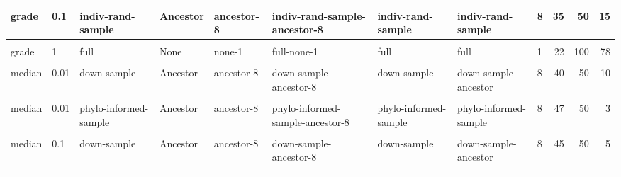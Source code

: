 \documentclass[
]{book}
\begin{document}
\begin{table}
\begin{tabular}{l|l|l|l|l|l|l|l|l|r|r|r}
\hline
grade & 0.1 & indiv-rand-sample & Ancestor & ancestor-8 & indiv-rand-sample-ancestor-8 & indiv-rand-sample & indiv-rand-sample & 8 & 35 & 50 & 15\\
\hline
\cellcolor{gray!6}{grade} & \cellcolor{gray!6}{0.1} & \cellcolor{gray!6}{phylo-informed-sample} & \cellcolor{gray!6}{Ancestor} & \cellcolor{gray!6}{ancestor-8} & \cellcolor{gray!6}{phylo-informed-sample-ancestor-8} & \cellcolor{gray!6}{phylo-informed-sample} & \cellcolor{gray!6}{phylo-informed-sample} & \cellcolor{gray!6}{8} & \cellcolor{gray!6}{29} & \cellcolor{gray!6}{50} & \cellcolor{gray!6}{21}\\
\hline
grade & 1 & full & None & none-1 & full-none-1 & full & full & 1 & 22 & 100 & 78\\
\hline
\cellcolor{gray!6}{median} & \cellcolor{gray!6}{0.01} & \cellcolor{gray!6}{down-sample} & \cellcolor{gray!6}{None} & \cellcolor{gray!6}{none-1} & \cellcolor{gray!6}{down-sample-none-1} & \cellcolor{gray!6}{down-sample} & \cellcolor{gray!6}{down-sample} & \cellcolor{gray!6}{1} & \cellcolor{gray!6}{50} & \cellcolor{gray!6}{50} & \cellcolor{gray!6}{0}\\
\hline
median & 0.01 & down-sample & Ancestor & ancestor-8 & down-sample-ancestor-8 & down-sample & down-sample-ancestor & 8 & 40 & 50 & 10\\
\hline
\cellcolor{gray!6}{median} & \cellcolor{gray!6}{0.01} & \cellcolor{gray!6}{indiv-rand-sample} & \cellcolor{gray!6}{Ancestor} & \cellcolor{gray!6}{ancestor-8} & \cellcolor{gray!6}{indiv-rand-sample-ancestor-8} & \cellcolor{gray!6}{indiv-rand-sample} & \cellcolor{gray!6}{indiv-rand-sample} & \cellcolor{gray!6}{8} & \cellcolor{gray!6}{45} & \cellcolor{gray!6}{50} & \cellcolor{gray!6}{5}\\
\hline
median & 0.01 & phylo-informed-sample & Ancestor & ancestor-8 & phylo-informed-sample-ancestor-8 & phylo-informed-sample & phylo-informed-sample & 8 & 47 & 50 & 3\\
\hline
\cellcolor{gray!6}{median} & \cellcolor{gray!6}{0.1} & \cellcolor{gray!6}{down-sample} & \cellcolor{gray!6}{None} & \cellcolor{gray!6}{none-1} & \cellcolor{gray!6}{down-sample-none-1} & \cellcolor{gray!6}{down-sample} & \cellcolor{gray!6}{down-sample} & \cellcolor{gray!6}{1} & \cellcolor{gray!6}{47} & \cellcolor{gray!6}{50} & \cellcolor{gray!6}{3}\\
\hline
median & 0.1 & down-sample & Ancestor & ancestor-8 & down-sample-ancestor-8 & down-sample & down-sample-ancestor & 8 & 45 & 50 & 5\\
\hline
\cellcolor{gray!6}{median} & \cellcolor{gray!6}{0.1} & \cellcolor{gray!6}{indiv-rand-sample} & \cellcolor{gray!6}{Ancestor} & \cellcolor{gray!6}{ancestor-8} & \cellcolor{gray!6}{indiv-rand-sample-ancestor-8} & \cellcolor{gray!6}{indiv-rand-sample} & \cellcolor{gray!6}{indiv-rand-sample} & \cellcolor{gray!6}{8} & \cellcolor{gray!6}{47} & \cellcolor{gray!6}{50} & \cellcolor{gray!6}{3}\\

\end{tabular}
\end{table}
\end{document}
